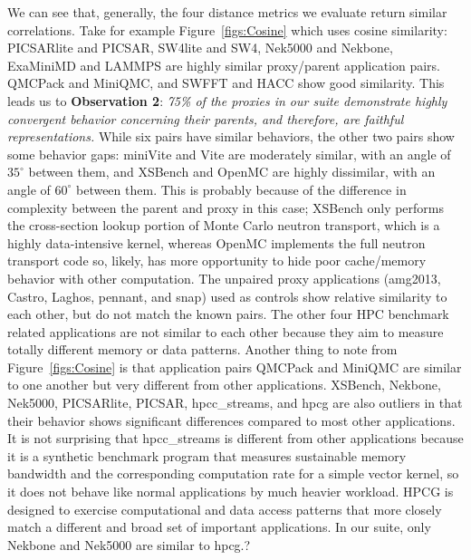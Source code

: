 We can see that, generally, the four distance metrics we evaluate return similar correlations. Take for example Figure~\ref{figs:Cosine} which uses cosine similarity: PICSARlite and PICSAR, SW4lite and SW4, Nek5000 and Nekbone, ExaMiniMD and LAMMPS are highly similar proxy/parent application pairs. QMCPack and MiniQMC, and SWFFT and HACC show good similarity.  This leads us to \textbf{Observation 2}: \textit{75\% of the proxies in our suite demonstrate highly convergent behavior concerning their parents, and therefore, are faithful representations.} While  six pairs have similar behaviors, the other two pairs show some behavior gaps: miniVite and Vite are moderately similar, with an angle of $35^\circ$ between them, and XSBench and OpenMC are highly dissimilar, with an angle of $60^\circ$ between them. This is probably because of the difference in complexity between the parent and proxy in this case; XSBench only performs the cross-section lookup portion of Monte Carlo neutron transport, which is a highly data-intensive kernel, whereas OpenMC implements the full neutron transport code so, likely, has more opportunity to hide poor cache/memory behavior with other computation. The unpaired proxy applications (amg2013, Castro, Laghos, pennant, and snap) used as controls show relative similarity to each other, but do not match the known pairs. The other four HPC benchmark related applications are not similar to each other because they aim to measure totally different memory or data patterns. Another thing to note from Figure~\ref{figs:Cosine} is that application pairs QMCPack and MiniQMC are similar to one another but very different from other applications. XSBench, Nekbone, Nek5000, PICSARlite, PICSAR, hpcc\_streams, and hpcg are also outliers in that their behavior shows significant differences compared to most other applications.  It is not surprising that hpcc\_streams is different from other applications because it is a synthetic benchmark program that measures sustainable memory bandwidth and the corresponding computation rate for a simple vector kernel, so it does not behave like normal applications by much heavier workload. HPCG is designed to exercise computational and data access patterns that more closely match a different and broad set of important applications. In our suite, only Nekbone and Nek5000 are similar to hpcg.\si{?}

